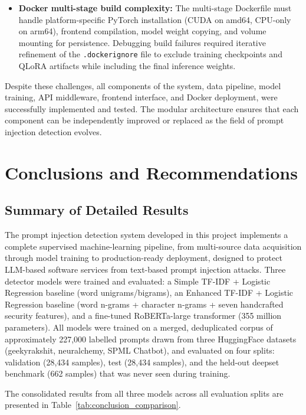 \documentclass[12pt, letterpaper]{article}   %
\begin{document}
\begin{itemize}
    \item \textbf{Docker multi-stage build complexity:} The multi-stage Dockerfile must handle platform-specific PyTorch installation (CUDA on amd64, CPU-only on arm64), frontend compilation, model weight copying, and volume mounting for persistence. Debugging build failures required iterative refinement of the \texttt{.dockerignore} file to exclude training checkpoints and QLoRA artifacts while including the final inference weights.
\end{itemize}

Despite these challenges, all components of the system, data pipeline, model training, API middleware, frontend interface, and Docker deployment, were successfully implemented and tested. The modular architecture ensures that each component can be independently improved or replaced as the field of prompt injection detection evolves.


\section{Conclusions and Recommendations}

\subsection{Summary of Detailed Results}

The prompt injection detection system developed in this project implements a complete supervised machine-learning pipeline, from multi-source data acquisition through model training to production-ready deployment, designed to protect LLM-based software services from text-based prompt injection attacks. Three detector models were trained and evaluated: a Simple TF-IDF + Logistic Regression baseline (word unigrams/bigrams), an Enhanced TF-IDF + Logistic Regression baseline (word n-grams + character n-grams + seven handcrafted security features), and a fine-tuned RoBERTa-large transformer (355 million parameters). All models were trained on a merged, deduplicated corpus of approximately 227,000 labelled prompts drawn from three HuggingFace datasets (geekyrakshit, neuralchemy, SPML Chatbot), and evaluated on four splits: validation (28,434 samples), test (28,434 samples), and the held-out deepset benchmark (662 samples) that was never seen during training.

The consolidated results from all three models across all evaluation splits are presented in Table~\ref{tab:conclusion_comparison}.
\end{document}
